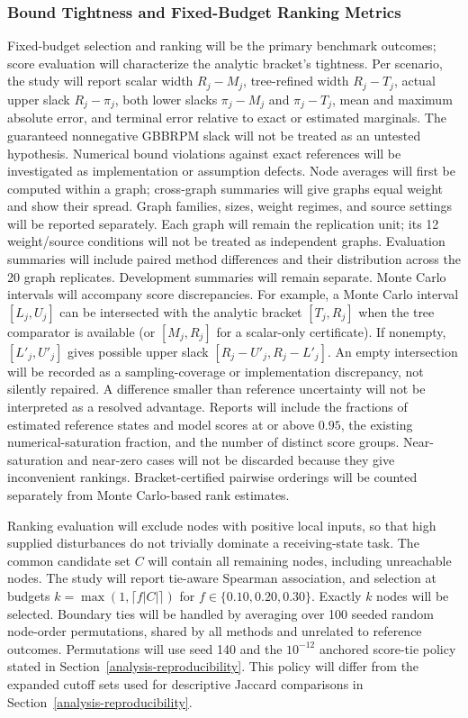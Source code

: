 \subsubsection{Bound Tightness and Fixed-Budget Ranking Metrics}
\label{reference-metrics}

Fixed-budget selection and ranking will be the primary benchmark outcomes;
score evaluation will characterize the analytic bracket's tightness.
Per scenario, the study will report scalar width $R_j-M_j$, tree-refined
width $R_j-T_j$, actual upper slack $R_j-\pi_j$, both lower slacks
$\pi_j-M_j$ and $\pi_j-T_j$, mean and maximum absolute error,
and terminal error relative to exact or estimated marginals. The guaranteed
nonnegative GBBRPM slack will not be treated as an untested hypothesis.
Numerical bound violations against exact references will be investigated
as implementation or assumption defects. Node averages will first be computed within a graph;
cross-graph summaries will give graphs equal weight and show their spread.
Graph families, sizes, weight regimes, and source settings will be reported
separately. Each graph will remain the replication unit; its 12 weight/source
conditions will not be treated as independent graphs. Evaluation summaries
will include paired method differences and their distribution across the
20 graph replicates. Development summaries will remain separate.
Monte Carlo intervals will accompany score discrepancies. For example,
a Monte Carlo interval $[L_j,U_j]$ can be intersected with the analytic
bracket $[T_j,R_j]$ when the tree comparator is available
(or $[M_j,R_j]$ for a scalar-only certificate). If nonempty, $[L'_j,U'_j]$ gives possible upper
slack $[R_j-U'_j,R_j-L'_j]$. An empty intersection will be recorded as a
sampling-coverage or implementation discrepancy, not silently repaired. A difference smaller than reference uncertainty
will not be interpreted as a resolved advantage. Reports will include the
fractions of estimated reference states and model scores at or above $0.95$,
the existing numerical-saturation fraction, and the number of distinct score
groups. Near-saturation and near-zero cases will not be discarded because
they give inconvenient rankings. Bracket-certified pairwise orderings will
be counted separately from Monte Carlo-based rank estimates.

Ranking evaluation will exclude nodes with positive local inputs, so that
high supplied disturbances do not trivially dominate a receiving-state task.
The common candidate set $C$ will contain all remaining nodes, including
unreachable nodes. The study will report tie-aware Spearman association,
and selection at budgets $k=\max(1,\lceil f|C|\rceil)$ for
$f\in\{0.10,0.20,0.30\}$. Exactly $k$ nodes will be selected. Boundary
ties will be handled by averaging over 100 seeded random node-order
permutations, shared by all methods and unrelated to reference outcomes. Permutations will
use seed 140 and the $10^{-12}$ anchored score-tie policy stated in
Section~\ref{analysis-reproducibility}.
This policy will differ from the expanded cutoff sets used for descriptive
Jaccard comparisons in Section~\ref{analysis-reproducibility}.

